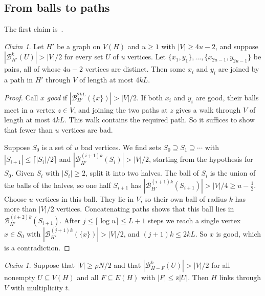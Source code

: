 \documentclass[11pt]{article}
\theoremstyle{definition}
\theoremstyle{remark}
\newtheorem{aclaim}[theorem]{Claim}
\numberwithin{equation}{section}
\numberwithin{figure}{section}
\numberwithin{table}{section}
\newcommand{\cB}{\mathcal{B}}
\begin{document}
\subsection*{From balls to paths}

The first claim is~\cite[Proposition~8]{BM}.

\begin{aclaim}\label{cl:halving}
Let $H'$ be a graph on $V(H)$ and $u\ge1$ with $|V|\ge4u-2$, and suppose
$|\cB^k_{H'}(U)|>|V|/2$ for every set $U$ of $u$ vertices. Let
$\{x_1,y_1\},\dots,\{x_{2u-1},y_{2u-1}\}$ be pairs, all of whose $4u-2$
vertices are distinct. Then some $x_i$ and $y_i$ are joined by a path in $H'$
through $V$ of length at most $4kL$.
\end{aclaim}

\begin{proof}
Call $x$ \emph{good} if $|\cB^{2kL}_{H'}(\{x\})|>|V|/2$. If both $x_i$ and $y_i$
are good, their balls meet in a vertex $z\in V$, and joining the two paths at
$z$ gives a walk through $V$ of length at most $4kL$. This walk contains the
required path. So it suffices to show that fewer than $u$ vertices are bad.

Suppose $S_0$ is a set of $u$ bad vertices. We find sets
$S_0\supseteq S_1\supseteq\cdots$ with $|S_{i+1}|\le\lceil|S_i|/2\rceil$ and
$|\cB^{(i+1)k}_{H'}(S_i)|>|V|/2$, starting from the hypothesis for $S_0$. Given
$S_i$ with $|S_i|\ge2$, split it into two halves. The ball of $S_i$ is the union
of the balls of the halves, so one half $S_{i+1}$ has
$|\cB^{(i+1)k}_{H'}(S_{i+1})|>|V|/4\ge u-\frac12$. Choose $u$ vertices in this
ball. They lie in $V$, so their own ball of radius $k$ has more than $|V|/2$
vertices. Concatenating paths shows that this ball lies in
$\cB^{(i+2)k}_{H'}(S_{i+1})$. After $j\le\lceil\log u\rceil\le L+1$ steps we
reach a single vertex $x\in S_0$ with $|\cB^{(j+1)k}_{H'}(\{x\})|>|V|/2$, and
$(j+1)k\le2kL$. So $x$ is good, which is a contradiction.
\end{proof}

\begin{aclaim}\label{cl:haxell}
Suppose that $|V|\ge\rho N/2$ and that $|\cB^k_{H-F}(U)|>|V|/2$ for all nonempty
$U\subseteq V(H)$ and all $F\subseteq E(H)$ with $|F|\le\bar s|U|$. Then $H$
links through $V$ with multiplicity $t$.
\end{aclaim}
\end{document}
